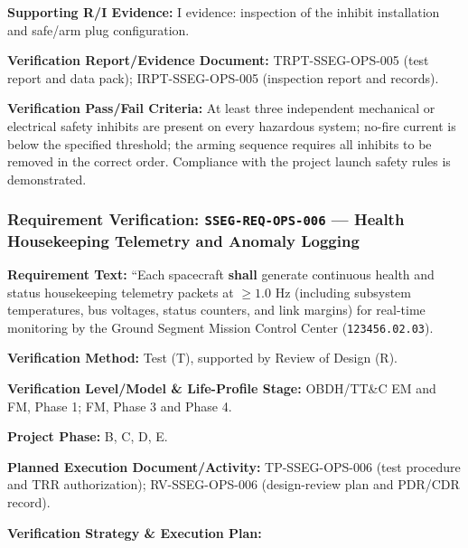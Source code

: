 \par\textbf{Supporting R/I Evidence:} I evidence: inspection of the inhibit installation and safe/arm plug configuration.
\par\textbf{Verification Report/Evidence Document:} TRPT-SSEG-OPS-005 (test report and data pack); IRPT-SSEG-OPS-005 (inspection report and records).
\par\textbf{Verification Pass/Fail Criteria:} At least three independent mechanical or electrical safety inhibits are present on every hazardous system; no-fire current is below the specified threshold; the arming sequence requires all inhibits to be removed in the correct order. Compliance with the project launch safety rules is demonstrated.
\par\medskip
\subsubsection{Requirement Verification: \texttt{SSEG-REQ-OPS-006} --- Health Housekeeping Telemetry and Anomaly Logging}
\label{ver:SSEG-REQ-OPS-006}
\textbf{Requirement Text:} ``Each spacecraft \textbf{shall} generate continuous health and status housekeeping telemetry packets at $\ge 1.0\text{ Hz}$ (including subsystem temperatures, bus voltages,  status counters, and  link margins) for real-time monitoring by the Ground Segment Mission Control Center (\texttt{123456.02.03}).
\par\textbf{Verification Method:} Test (T), supported by Review of Design (R).
\par\textbf{Verification Level/Model \& Life-Profile Stage:} OBDH/TT\&C EM and FM, Phase 1; FM, Phase 3 and Phase 4.
\par\textbf{Project Phase:} B, C, D, E.
\par\textbf{Planned Execution Document/Activity:} TP-SSEG-OPS-006 (test procedure and TRR authorization); RV-SSEG-OPS-006 (design-review plan and PDR/CDR record).
\par\textbf{Verification Strategy \& Execution Plan:}
